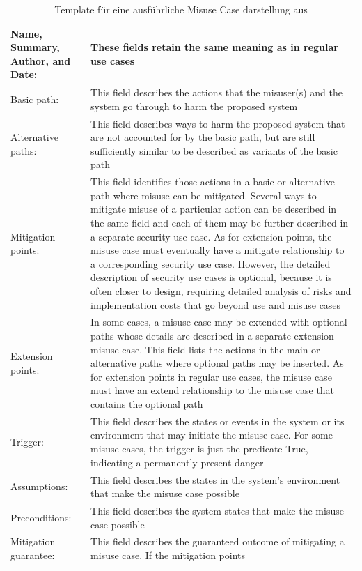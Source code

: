 \begin{table}
\scriptsize
\centering
\caption{Template für eine ausführliche Misuse Case darstellung aus \cite{sindre2005eliciting}}
\label{tab:MisuseCaseTemplate}
\begin{tabular}{p{}p{}}
\hline 
Name, Summary, Author,
and Date: & These fields retain the same meaning as in regular use cases \\ 
\hline 
Basic path: & This field describes the actions that the misuser(s) and the system go through to harm the
proposed system \\ 
\hline 
Alternative paths: & This field describes ways to harm the proposed system that are not accounted for by the basic path,
but are still sufficiently similar to be described as variants of the basic path \\ 
\hline 
Mitigation points: & This field identifies those actions in a basic or alternative path where misuse can be mitigated.
Several ways to mitigate misuse of a particular action can be described in the same field and
each of them may be further described in a separate security use case. As for extension
points, the misuse case must eventually have a mitigate relationship to a corresponding
security use case. However, the detailed description of security use cases is optional, because
it is often closer to design, requiring detailed analysis of risks and implementation
costs that go beyond use and misuse cases \\ 
\hline 
Extension points: & In some cases, a misuse case may be extended with optional paths whose details are described
in a separate extension misuse case. This field lists the actions in the main or alternative paths
where optional paths may be inserted. As for extension points in regular use cases, the misuse
case must have an extend relationship to the misuse case that contains the optional path \\ 
\hline 
Trigger: & This field describes the states or events in the system or its environment that may initiate the
misuse case. For some misuse cases, the trigger is just the predicate True, indicating
a permanently present danger \\ 
\hline 
Assumptions: & This field describes the states in the system’s environment that make the misuse case possible \\ 
\hline 
Preconditions: & This field describes the system states that make the misuse case possible \\ 
\hline 
Mitigation guarantee: & This field describes the guaranteed outcome of mitigating a misuse case. If the mitigation points

\end{tabular}
\end{table}
